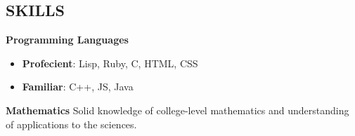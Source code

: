 \documentclass[line,margin]{res}
\begin{document}
\begin{resume}
  \section{SKILLS}
  {\bf\rmfamily Programming Languages} \quad
  \begin{itemize} \itemsep -2pt
  \item {\bf Profecient}: Lisp, Ruby, C, HTML, CSS
  \item {\bf Familiar}: C++, JS, Java
  \end{itemize}

  {\bf\rmfamily Mathematics} \quad
  Solid knowledge of college-level mathematics and understanding of applications to the sciences.





\end{resume}
\end{document}

